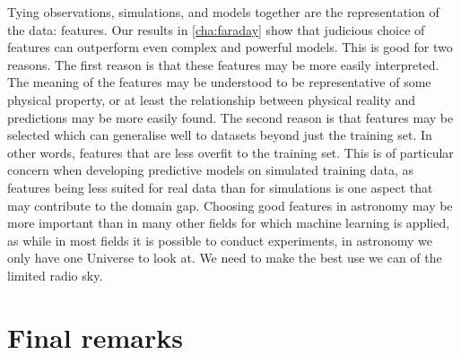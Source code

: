 \documentclass[11pt, a4paper]{book}
\begin{document}
    Tying observations, simulations, and models together are the representation of the data: features. Our results in \autoref{cha:faraday} show that judicious choice of features can outperform even complex and powerful models. This is good for two reasons. The first reason is that these features may be more easily interpreted. The meaning of the features may be understood to be representative of some physical property, or at least the relationship between physical reality and predictions may be more easily found. The second reason is that features may be selected which can generalise well to datasets beyond just the training set. In other words, features that are less overfit to the training set. This is of particular concern when developing predictive models on simulated training data, as features being less suited for real data than for simulations is one aspect that may contribute to the domain gap. Choosing good features in astronomy may be more important than in many other fields for which machine learning is applied, as while in most fields it is possible to conduct experiments, in astronomy we only have one Universe to look at. We need to make the best use we can of the limited radio sky.


\section{Final remarks}
\label{sec:final-remarks}
\end{document}
